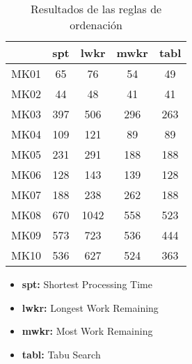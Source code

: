 \begin{table}[ht]
    \centering
    \begin{tabular}[ht]{|l|cccc|}
        \hline
                  & spt & lwkr & mwkr & tabl \\
        \hline
        MK01      & 65      & 76    & 54    & 49    \\
        MK02      & 44      & 48    & 41    & 41    \\
        MK03      & 397     & 506   & 296   & 263   \\
        MK04      & 109     & 121   & 89    & 89    \\
        MK05      & 231     & 291   & 188   & 188   \\
        MK06      & 128     & 143   & 139   & 128   \\
        MK07      & 188     & 238   & 262   & 188   \\
        MK08      & 670     & 1042  & 558   & 523   \\
        MK09      & 573     & 723   & 536   & 444   \\
        MK10      & 536     & 627   & 524   & 363   \\
        \hline
    \end{tabular}
    \caption{Resultados de las reglas de ordenación}
\end{table}

\begin{itemize}
    \item \textbf{spt:} Shortest Processing Time
    \item \textbf{lwkr:} Longest Work Remaining
    \item \textbf{mwkr:} Most Work Remaining
    \item \textbf{tabl:} Tabu Search
\end{itemize}

